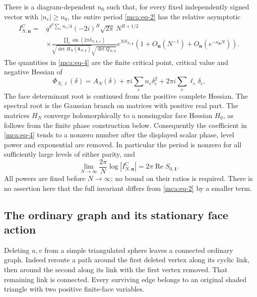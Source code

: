 There is a diagram-dependent \(n_0\) such that, for every fixed
independently signed vector with \(|n_e|\ge n_0\), the entire period
\eqref{mca:eq-2} has the relative asymptotic \begin{equation}\label{mca:eq-4}
\begin{split}
 I_{N,\mathbf n}^{\mathrm C}
 ={}&q^{d^2\sum_e n_e/4}(-2i)^R\sqrt{2\pi}\,N^{R+1/2}\\
 &\times
 \frac{\prod_e\sin(2\pi\delta_{N,\mathbf1,e})}
 {\sqrt{\det H_N(\boldsymbol\delta_{N,\mathbf1})}
       \sqrt{\det Q_{N,\mathbf1}}}
 e^{NS_{N,\mathbf1}}
 \left(1+O_{\mathbf n}(N^{-1})
              +O_{\mathbf n}(e^{-\kappa_{\mathbf n}N})\right).
 \end{split}
\end{equation} The quantities in \eqref{mca:eq-4} are the finite critical point,
critical value and negative Hessian of \begin{equation}\label{mca:eq-5}
\Phi_{N,\boldsymbol\ell}(\delta)
   =A_N(\delta)+\pi i\sum_e n_e\delta_e^2
                         +2\pi i\sum_e\ell_e\delta_e.
\end{equation} The face determinant root is continued from the positive complete
Hessian. The spectral root is the Gaussian branch on matrices with
positive real part. The matrices $H_N$ converge holomorphically to a nonsingular face
Hessian $H_0$, as follows from the finite phase construction below.
Consequently the coefficient in \eqref{mca:eq-4} tends to a nonzero
number after the displayed scalar phase, level power and exponential
are removed.
In particular the period is nonzero for all sufficiently large levels of
either parity, and \begin{equation}\label{mca:eq-6}
\lim_{N\to\infty}\frac{2\pi}{N}\log|I_{N,\mathbf n}^{\mathrm C}|
                  =2\pi\operatorname{Re}S_{0,\mathbf1}.
\end{equation} All powers are fixed before \(N\to\infty\); no bound on their ratios
is required. There is no assertion here that the full invariant differs
from \eqref{mca:eq-2} by a smaller term.

\subsection{The ordinary graph and its stationary face action}\label{mca:sec-2}

Deleting \(u,v\) from a simple triangulated sphere leaves a connected
ordinary graph. Indeed reroute a path around the first deleted vertex
along its cyclic link, then around the second along its link with the
first vertex removed. That remaining link is connected. Every surviving
edge belongs to an original shaded triangle with two positive
finite-face variables.

